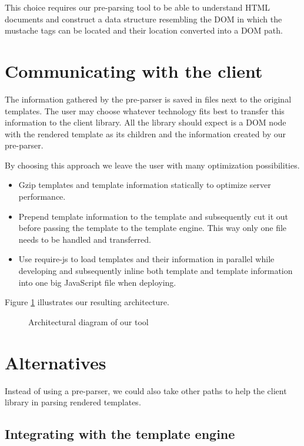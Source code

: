 \documentclass[thesis.tex]{subfiles}
\begin{document}
This choice requires our pre-parsing tool to be able to understand
HTML documents and construct a data structure resembling the DOM in which the
mustache tags can be located and their location converted into a DOM path.

\section{Communicating with the client}

The information gathered by the pre-parser is saved in files next to the
original templates. The user may choose whatever technology fits best to
transfer this information to the client library. All the library should expect
is a DOM node with the rendered template as its children and the information
created by our pre-parser.

By choosing this approach we leave the user with many optimization
possibilities.
\begin{itemize}
\item Gzip templates and template information statically to optimize
      server performance.
\item Prepend template information to the template and subsequently
      cut it out before passing the template to the template engine.
      This way only one file needs to be handled and transferred.
\item Use require-js to load templates and their information in parallel
      while developing and subsequently inline both template and
      template information into one big JavaScript file when deploying.
\end{itemize}

Figure \ref{fig:architecture} illustrates our resulting architecture.

\begin{figure}
	\centering
	\resizebox{\linewidth}{!}{}
	\caption{Architectural diagram of our tool}
	\label{fig:architecture}
\end{figure}

\section{Alternatives}

Instead of using a pre-parser, we could also take other paths to help
the client library in parsing rendered templates.

\subsection{Integrating with the template engine}
\end{document}
